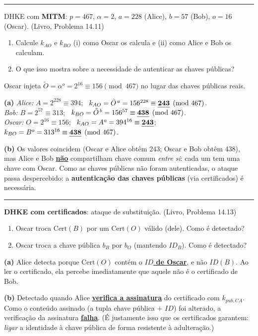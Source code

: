 \documentclass[11pt,a4paper]{article}
\newcommand{\livro}[1]{{\footnotesize\color{black!50}(Livro, Problema #1)}}
\newcommand{\alert}[1]{\textbf{\uline{#1}}}
\newcommand{\exercicio}[1]{%
    \Needspace{8\baselineskip}%
    \par\vspace{1.2em}
    \noindent
    {\color{black!55}\rule[-0.25em]{3pt}{1.6em}}%
    \hspace{0.6em}{\Large\bfseries Exerc\'{i}cio #1}
    \par\vspace{-0.4em}
    \noindent{\color{black!35}\rule{\textwidth}{0.4pt}}
    \par\vspace{0.35em}
}
\newenvironment{resposta}{%
    \begin{respostabox}
    \color{red!70!black}\sloppy
}{%
    \end{respostabox}
}
\begin{document}
\exercicio{6}
DHKE com \textbf{MITM}: $p = 467$, $\alpha = 2$, $a = 228$ (Alice), $b = 57$ (Bob), $o = 16$ (Oscar). \livro{14.11}
\begin{enumerate}[label=(\alph*)]
    \item Calcule $k_{AO}$ e $k_{BO}$ (i) como Oscar os calcula e (ii) como Alice e Bob os calculam.
    \item O que isso mostra sobre a necessidade de autenticar as chaves p\'{u}blicas?
\end{enumerate}
\begin{resposta}
Oscar injeta $\tilde{O} = \alpha^{o} = 2^{16} \equiv 156 \pmod{467}$ no lugar das chaves p\'{u}blicas reais.

\textbf{(a)} \emph{Alice:} $A = 2^{228} \equiv 394$; \ $k_{AO} = \tilde{O}^{\,a} = 156^{228} \equiv \alert{243} \pmod{467}$.\\
\emph{Bob:} $B = 2^{57} \equiv 313$; \ $k_{BO} = \tilde{O}^{\,b} = 156^{57} \equiv \alert{438} \pmod{467}$.\\
\emph{Oscar:} $O = 2^{16} \equiv 156$; \ $k_{AO} = A^{o} = 394^{16} \equiv \alert{243}$; \ $k_{BO} = B^{o} = 313^{16} \equiv \alert{438} \pmod{467}$.

\textbf{(b)} Os valores coincidem (Oscar e Alice obt\^{e}m 243; Oscar e Bob obt\^{e}m 438), mas Alice e Bob \alert{n\~{a}o} compartilham chave comum \emph{entre si}: cada um tem uma chave com Oscar. Como as chaves p\'{u}blicas n\~{a}o foram autenticadas, o ataque passa despercebido: a \textbf{autentica\c{c}\~{a}o das chaves p\'{u}blicas} (via certificados) \'{e} necess\'{a}ria.
\end{resposta}

\exercicio{7}
\textbf{DHKE com certificados}: ataque de substitui\c{c}\~{a}o. \livro{14.13}
\begin{enumerate}[label=(\alph*)]
    \item Oscar troca $\text{Cert}(B)$ por um $\text{Cert}(O)$ v\'{a}lido (dele). Como \'{e} detectado?
    \item Oscar troca a chave p\'{u}blica $b_B$ por $b_O$ (mantendo $ID_B$). Como \'{e} detectado?
\end{enumerate}
\begin{resposta}
\textbf{(a)} Alice detecta porque $\text{Cert}(O)$ cont\'{e}m o \alert{$ID$ de Oscar}, e n\~{a}o $ID(B)$. Ao ler o certificado, ela percebe imediatamente que aquele n\~{a}o \'{e} o certificado de Bob.

\textbf{(b)} Detectado quando Alice \alert{verifica a assinatura} do certificado com $k_{pub,CA}$. Como o conte\'{u}do assinado (a tupla chave p\'{u}blica $+$ $ID$) foi alterado, a verifica\c{c}\~{a}o da assinatura \alert{falha}. (\'{E} justamente isso que os certificados garantem: \emph{ligar} a identidade \`{a} chave p\'{u}blica de forma resistente \`{a} adultera\c{c}\~{a}o.)
\end{resposta}
\end{document}
